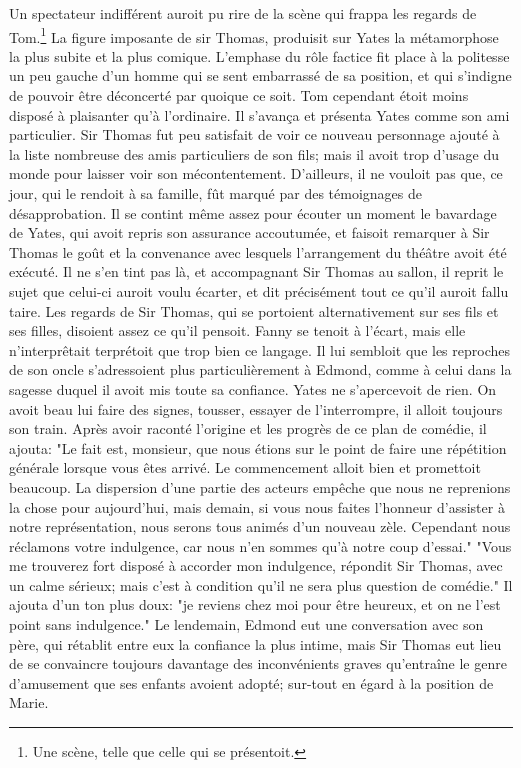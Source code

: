 Un spectateur indifférent auroit pu rire de la scène qui frappa les regards de Tom.\footnote{Une scène, telle que celle qui se présentoit.} La figure imposante de sir Thomas, produisit sur Yates la métamorphose la plus\setcounter{page}{136} subite et la plus comique. L'emphase du rôle factice fit place à la politesse un peu gauche d'un homme qui se sent embarrassé de sa position, et qui s'indigne de pouvoir être déconcerté par quoique ce soit.
Tom cependant étoit moins disposé à plaisanter qu'à l'ordinaire. Il s'avança et présenta Yates comme son ami particulier. Sir Thomas fut peu satisfait de voir ce nouveau personnage ajouté à la liste nombreuse des amis particuliers de son fils; mais il avoit trop d'usage du monde pour laisser voir son mécontentement. D'ailleurs, il ne vouloit pas que, ce jour, qui le rendoit à sa famille, fût marqué par des témoignages de désapprobation. Il se contint même assez pour écouter un moment le bavardage de Yates, qui avoit repris son assurance accoutumée, et faisoit remarquer à Sir Thomas le goût et la convenance avec lesquels l'arrangement du théâtre avoit été exécuté. Il ne s'en tint pas là, et accompagnant Sir Thomas au sallon, il reprit le sujet que celui-ci auroit voulu écarter, et dit précisément tout ce qu'il auroit fallu taire. Les regards de Sir Thomas, qui se portoient alternativement sur ses fils et ses filles, disoient assez ce qu'il pensoit. Fanny se tenoit à l'écart, mais elle n'interprêtait\setcounter{page}{137} terprétoit que trop bien ce langage. Il lui sembloit que les reproches de son oncle s'adressoient plus particulièrement à Edmond, comme à celui dans la sagesse duquel il avoit mis toute sa confiance. Yates ne s'apercevoit de rien. On avoit beau lui faire des signes, tousser, essayer de l'interrompre, il alloit toujours son train. Après avoir raconté l'origine et les progrès de ce plan de comédie, il ajouta: "Le fait est, monsieur, que nous étions sur le point de faire une répétition générale lorsque vous êtes arrivé. Le commencement alloit bien et promettoit beaucoup. La dispersion d'une partie des acteurs empêche que nous ne reprenions la chose pour aujourd'hui, mais demain, si vous nous faites l'honneur d'assister à notre représentation, nous serons tous animés d'un nouveau zèle. Cependant nous réclamons votre indulgence, car nous n'en sommes qu'à notre coup d'essai." "Vous me trouverez fort disposé à accorder mon indulgence, répondit Sir Thomas, avec un calme sérieux; mais c'est à condition qu'il ne sera plus question de comédie." Il ajouta d'un ton plus doux: "je reviens chez moi pour être heureux, et on ne l'est point sans indulgence."\setcounter{page}{138} Le lendemain, Edmond eut une conversation avec son père, qui rétablit entre eux la confiance la plus intime, mais Sir Thomas eut lieu de se convaincre toujours davantage des inconvénients graves qu'entraîne le genre d'amusement que ses enfants avoient adopté; sur-tout en égard à la position de Marie.
